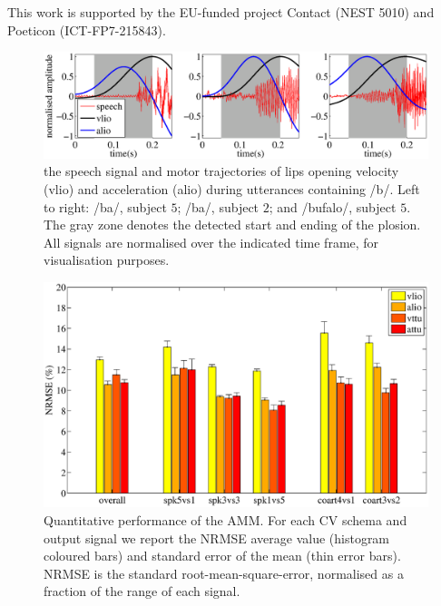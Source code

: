 \documentclass{pnastwo}
\newcommand{\vlio}{\textsf{vlio}}
\newcommand{\alio}{\textsf{alio}}
\begin{document}
\begin{article}









\begin{acknowledgments}
  This work is supported by the EU-funded project Contact (NEST 5010) and Poeticon (ICT-FP7-215843).
\end{acknowledgments}


 

\end{article}


\begin{figure}[t]
  \centerline{\includegraphics[width=\textwidth]{figs/figSamples}}
  \caption{the speech signal and motor trajectories of lips opening
    velocity (\vlio) and acceleration (\alio) during utterances containing /b/.
    Left to right: /ba/, subject $5$; /ba/, subject $2$; and /bufalo/, subject $5$.
    The gray zone denotes the detected start and ending of the plosion. All signals
    are normalised over the indicated time frame, for visualisation purposes.}
  \label{fig:isdView}
\end{figure}

\begin{figure}[t]
  \centerline{\includegraphics[width=.5\textwidth]{figs/figAMM}}
  \caption{Quantitative performance of the AMM. For each CV schema and output signal
    we report the NRMSE average value (histogram coloured bars) and standard error of
    the mean (thin error bars). NRMSE is the standard root-mean-square-error, normalised
    as a fraction of the range of each signal.}
  \label{fig:amm_perf}
\end{figure}
\end{document}
